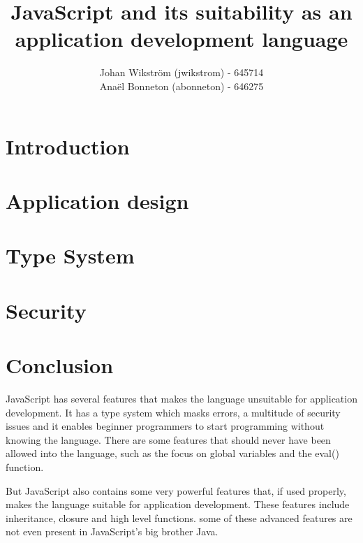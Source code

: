 \documentclass{report}
\title{JavaScript and its suitability as an application development language}
\author{Johan Wikström (jwikstrom) - 645714\\
Anaël Bonneton (abonneton) - 646275 
}
\begin{document}
\maketitle
\tableofcontents

\section{Introduction}


\section{Application design}


\section{Type System}


\section{Security}




\section{Conclusion}
JavaScript has several features that makes the language unsuitable for application development. It has a type system which masks errors, a multitude of security issues and it enables beginner programmers to start programming without knowing the language. There are some features that should never have been allowed into the language, such as the focus on global variables and the eval() function.

But JavaScript also contains some very powerful features that, if used properly, makes the language suitable for application development. These features include inheritance, closure and high level functions. some of these advanced features are not even present in JavaScript's big brother Java.
\end{document}
